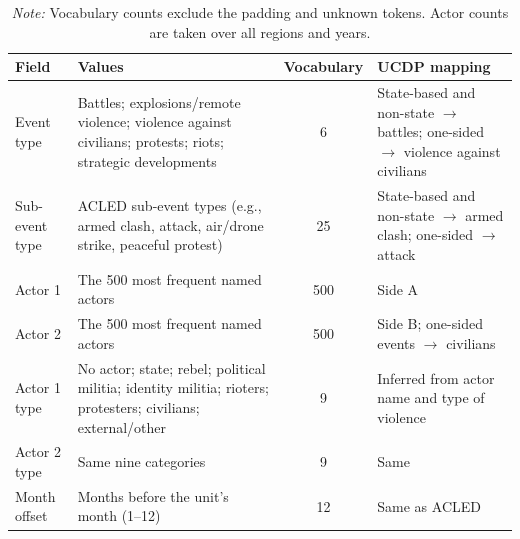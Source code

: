 \documentclass[11pt, letterpaper]{article}
\begin{document}
\begin{table}[!htbp]
\centering
\caption{Event Fields Read by the Encoder}
\label{tab:event_fields}
\small
\begin{tabular}{p{2.2cm}p{5.6cm}cp{4.2cm}}
\hline
Field & Values & Vocabulary & UCDP mapping \\
\hline
Event type & Battles; explosions/remote violence; violence against civilians; protests; riots; strategic developments & 6 & State-based and non-state $\rightarrow$ battles; one-sided $\rightarrow$ violence against civilians \\
Sub-event type & ACLED sub-event types (e.g., armed clash, attack, air/drone strike, peaceful protest) & 25 & State-based and non-state $\rightarrow$ armed clash; one-sided $\rightarrow$ attack \\
Actor 1 & The 500 most frequent named actors & 500 & Side A \\
Actor 2 & The 500 most frequent named actors & 500 & Side B; one-sided events $\rightarrow$ civilians \\
Actor 1 type & No actor; state; rebel; political militia; identity militia; rioters; protesters; civilians; external/other & 9 & Inferred from actor name and type of violence \\
Actor 2 type & Same nine categories & 9 & Same \\
Month offset & Months before the unit's month (1--12) & 12 & Same as ACLED \\
\hline
\end{tabular}
\caption*{\footnotesize \textit{Note:} Vocabulary counts exclude the padding and unknown tokens. Actor counts are taken over all regions and years.}
\end{table}


\end{document}
